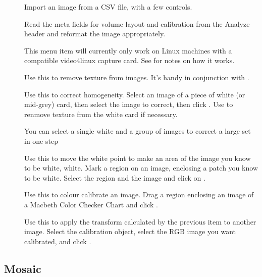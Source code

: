 \begin{description}

\item[]
	Import an image from a CSV file, with a few controls.

\item[]
	Read the meta fields for volume layout and calibration from the
	Analyze header and reformat the image appropriately.

\item[]
	This menu item will currently only work on Linux machines with a
	compatible video4linux capture card. See 
	for notes on how it works.

\item[]
	Use this to remove texture from images. It's handy in conjunction with
	.

\item[]
	Use this to correct homogeneity. Select an image of a piece of white
	(or mid-grey) card, then select the image to correct, then click
	. Use  to renmove texture from the white card
	if necessary.

	You can select a single white and a group of images to correct a large
	set in one step

\item[]
	Use this to move the white point to make an area of the image you know
	to be white, white.
	Mark a region on an image, enclosing a patch you know to be white.
	Select the region and the image and click on .

\item[]
	Use this to colour calibrate an image. Drag a region enclosing an
	image of a Macbeth Color Checker Chart and click . 

\item[]
	Use this to apply the transform calculated by the previous item to
	another image. Select the calibration object, select the RGB image
	you want calibrated, and click .

\end{description}

\subsection{Mosaic}

